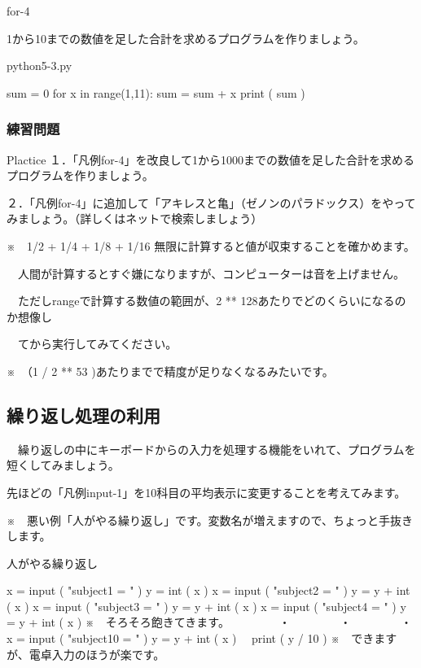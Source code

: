 \documentclass[11pt,a4paper,dvipdfmx,titlepage]{jsreport}
\begin{document}
\newpage
\begin{pabox}{for-4}

1から10までの数値を足した合計を求めるプログラムを作りましょう。


\begin{legbox}{python5-3.py}
\begin{listing}{1}
sum = 0
for x in range(1,11):
    sum = sum + x
print ( sum ) 
\end{listing}
\end{legbox}
\end{pabox}
\subsubsection{練習問題}
\begin{plabox}{Plactice}
１．「凡例for-4」を改良して1から1000までの数値を足した合計を求めるプログラムを作りましょう。

２．「凡例for-4」に追加して「アキレスと亀」（ゼノンのパラドックス）をやってみましょう。（詳しくはネットで検索しましょう）

※　1/2 + 1/4 + 1/8 + 1/16 無限に計算すると値が収束することを確かめます。

　人間が計算するとすぐ嫌になりますが、コンピューターは音を上げません。

　ただしrangeで計算する数値の範囲が、2 ** 128あたりでどのくらいになるのか想像し

　てから実行してみてください。

※　（1 / 2 ** 53 )あたりまでで精度が足りなくなるみたいです。




\end{plabox}
\newpage
\subsection{繰り返し処理の利用}
　繰り返しの中にキーボードからの入力を処理する機能をいれて、プログラムを短くしてみましょう。

先ほどの「凡例input-1」を10科目の平均表示に変更することを考えてみます。

※　悪い例「人がやる繰り返し」です。変数名が増えますので、ちょっと手抜きします。
\begin{grabox}{人がやる繰り返し}
\begin{listing}{1}
x = input ( "subject1 = " )
y = int ( x ) 
x = input ( "subject2 = " )
y = y + int ( x ) 
x = input ( "subject3 = " )
y = y + int ( x ) 
x = input ( "subject4 = " )
y = y + int ( x ) 
※　そろそろ飽きてきます。
　　　　・
　　　　・
　　　　・
x = input ( "subject10 = " )
y = y + int ( x )　
print ( y / 10 )
※　できますが、電卓入力のほうが楽です。
\end{listing}
\end{grabox}
\end{document}
